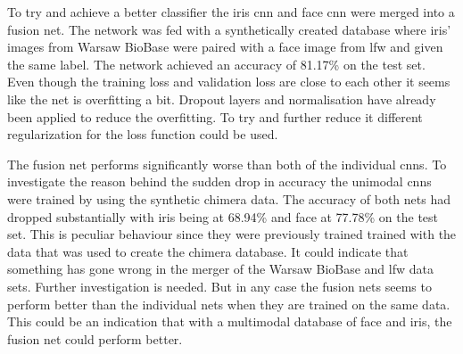 To try and achieve a better classifier the iris \gls{cnn} and face \gls{cnn} were merged into a fusion net. The network was fed with a synthetically created database where iris' images from Warsaw BioBase were paired with a face image from \gls{lfw} and given the same label. The network achieved an accuracy of 81.17\% on the test set.  Even though the training loss and validation loss are close to each other it seems like the net is overfitting a bit. Dropout layers and normalisation have already been applied to reduce the overfitting. To try and further reduce it different regularization for the loss function could be used.

The fusion net performs significantly worse than both of the individual \gls{cnn}s. To investigate the reason behind the sudden drop in accuracy the unimodal \gls{cnn}s were trained by using the synthetic chimera data. The accuracy of both nets had dropped substantially with iris being at 68.94\% and face at 77.78\% on the test set. This is peculiar behaviour since they were previously trained trained with the data that was used to create the chimera database. It could indicate that something has gone wrong in the merger of the Warsaw BioBase and \gls{lfw} data sets. Further investigation is needed. But in any case the fusion nets seems to perform better than the individual nets when they are trained on the same data. This could be an indication that with a multimodal database of face and iris, the fusion net could perform better. 